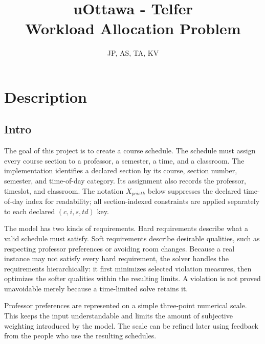 \documentclass[11pt, oneside]{article}   	%
\title{uOttawa - Telfer \\ Workload Allocation Problem}
\author{JP, AS, TA, KV}
\begin{document}
\maketitle


\section{Description}
\subsection{Intro}
The goal of this project is to create a course schedule. The schedule must
assign every course section to a professor, a semester, a time, and a
classroom. The implementation identifies a declared section by its course,
section number, semester, and time-of-day category. Its assignment also records
the professor, timeslot, and classroom. The notation $X_{pcistk}$ below suppresses
the declared time-of-day index for readability; all section-indexed constraints
are applied separately to each declared $(c,i,s,td)$ key.

The model has two kinds of requirements. Hard requirements describe what a
valid schedule must satisfy. Soft requirements describe desirable qualities,
such as respecting professor preferences or avoiding room changes. Because a
real instance may not satisfy every hard requirement, the solver handles the
requirements hierarchically: it first minimizes selected violation measures, then
optimizes the softer qualities within the resulting limits. A violation is not
proved unavoidable merely because a time-limited solve retains it.

Professor preferences are represented on a simple three-point numerical scale.
This keeps the input understandable and limits the amount of subjective
weighting introduced by the model. The scale can be refined later using
feedback from the people who use the resulting schedules.


\newpage
\end{document}
